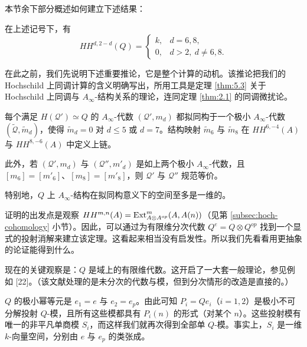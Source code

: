 本节余下部分概述如何建立下述结果：

\begin{proposition}\label{prop:6.2}
在上述记号下，有
\[
HH^{d,2-d}(Q)=\begin{cases}k, & d=6,8,\\ 0, & d>2,\ d\neq6,8.\end{cases}
\]
\end{proposition}

在此之前，我们先说明下述重要推论，它是整个计算的动机。该推论把我们的 Hochschild 上同调计算的含义明确写出，所用工具是定理 \ref{thm:5.3} 关于 Hochschild 上同调与 $A_\infty$-结构关系的理论，连同定理 \ref{thm:2.1} 的同调微扰论。

\begin{corollary*}
每个满足 $H(\mathcal{Q}')\simeq Q$ 的 $A_\infty$-代数 $(\mathcal{Q}',m_d)$ 都拟同构于一个极小 $A_\infty$-代数 $(\tilde{\mathcal{Q}},\tilde m_d)$，使得 $\tilde m_d=0$ 对 $d\le5$ 或 $d=7$。结构映射 $\tilde m_6$ 与 $\tilde m_8$ 在 $HH^{6,-4}(A)$ 与 $HH^{8,-6}(A)$ 中定义上链。

此外，若 $(\mathcal{Q}',m_d)$ 与 $(\mathcal{Q}'',m'_d)$ 是如上两个极小 $A_\infty$-代数，且 $[m_6]=[m'_6]$、$[m_8]=[m'_8]$，则 $\mathcal{Q}'$ 与 $\mathcal{Q}''$ 规范等价。

特别地，$Q$ 上 $A_\infty$-结构在拟同构意义下的空间至多是一维的。
\end{corollary*}



证明的出发点是观察 $HH^{m,n}(A)=\operatorname{Ext}^m_{A\otimes A^{op}}(A,A(n))$（见第 \ref{subsec:hoch-cohomology} 小节）。因此，可以通过为有限维分次代数 $Q^e=Q\otimes Q^{op}$ 找到一个显式的投射消解来建立该定理。这看起来相当没有启发性。所以我们先看看用更抽象的论证能得到什么。

现在的关键观察是：$Q$ 是域上的有限维代数。这开启了一大套一般理论，参见例如 [22]。（该文献处理的是未分次的代数与模，但到分次情形的改造是直接的。）

$Q$ 的极小幂等元是 $e_1=e$ 与 $e_2=e_p$。由此可知 $P_i=Qe_i$（$i=1,2$）是极小不可分解投射 $Q$-模，且所有这些模都具有 $P_i(n)$ 的形式（对某个 $n$）。这些投射模有唯一的非平凡单商模 $S_i$，而这样我们就再次得到全部单 $Q$-模。事实上，$S_i$ 是一维 $k$-向量空间，分别由 $e$ 与 $e_p$ 的类张成。

